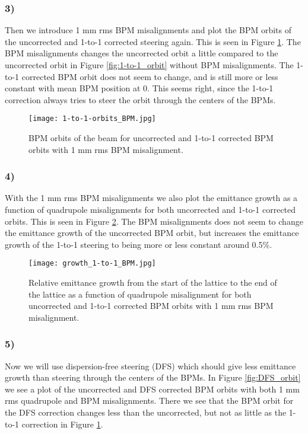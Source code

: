 \documentclass[12pt,a4paper,english]{article}
\begin{document}
\subsubsection*{3)}
Then we introduce 1 mm rms BPM misalignments and plot the BPM orbits of the uncorrected and 1-to-1 corrected steering again. This is seen in Figure \ref{fig:1-to-1_BPM_orbit}. The BPM misalignments changes the uncorrected orbit a little compared to the uncorrected orbit in Figure \ref{fig:1-to-1_orbit} without BPM misalignments. The 1-to-1 corrected BPM orbit does not seem to change, and is still more or less constant with mean BPM position at 0. This seems right, since the 1-to-1 correction always tries to steer the orbit through the centers of the BPMs.

\begin{figure}[htbp!]
	\centering\texttt{[image: 1-to-1-orbits\_BPM.jpg]}
	\caption{BPM orbits of the beam for uncorrected and 1-to-1 corrected BPM orbits with 1 mm rms BPM misalignment. \label{fig:1-to-1_BPM_orbit}}
\end{figure} 

\subsubsection*{4)}
With the 1 mm rms BPM misalignments we also plot the emittance growth as a function of quadrupole misalignments for both uncorrected and 1-to-1 corrected orbits. This is seen in Figure \ref{fig:em_growth_1to1_BPM}. The BPM misalignments does not seem to change the emittance growth of the uncorrected BPM orbit, but increases the emittance growth of the 1-to-1 steering to being more or less constant around 0.5\%.

\begin{figure}[htbp!]
	\centering\texttt{[image: growth\_1-to-1\_BPM.jpg]}
	\caption{Relative emittance growth from the start of the lattice to the end of the lattice as a function of quadrupole misalignment for both uncorrected and 1-to-1 corrected BPM orbits with 1 mm rms BPM misalignment. \label{fig:em_growth_1to1_BPM}}
\end{figure} 

\subsubsection*{5)}
Now we will use dispersion-free steering (DFS) which should give less emittance growth than steering through the centers of the BPMs. In Figure \ref{fig:DFS_orbit} we see a plot of the uncorrected and DFS corrected BPM orbits with both 1 mm rms quadrupole and BPM misalignments. There we see that the BPM orbit for the DFS correction changes less than the uncorrected, but not as little as the 1-to-1 correction in Figure \ref{fig:1-to-1_BPM_orbit}. 
\end{document}
